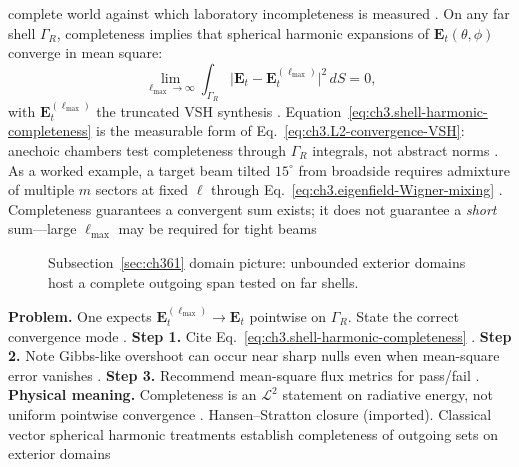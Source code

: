 complete world against which laboratory incompleteness is measured .
On any far shell \(\Gamma_R\), completeness implies that spherical harmonic expansions of
\(\mathbf{E}_{t}(\theta,\phi)\) converge in mean square:
\begin{equation}
\label{eq:ch3.shell-harmonic-completeness}
\lim_{\ell_{\max}\to\infty}
\int_{\Gamma_R}
\big|\mathbf{E}_{t}-\mathbf{E}_{t}^{(\ell_{\max})}\big|^{2}\,dS
=
0,
\end{equation}
with \(\mathbf{E}_{t}^{(\ell_{\max})}\) the truncated VSH synthesis .
Equation~\eqref{eq:ch3.shell-harmonic-completeness} is the measurable form of
Eq.~\eqref{eq:ch3.L2-convergence-VSH}: anechoic chambers test completeness through \(\Gamma_R\) integrals, not abstract
norms .
As a worked example, a target beam tilted \(15^{\circ}\) from broadside requires admixture of multiple \(m\) sectors at fixed \(\ell\)
through Eq.~\eqref{eq:ch3.eigenfield-Wigner-mixing} . Completeness guarantees a convergent
sum exists; it does not guarantee a \emph{short} sum---large \(\ell_{\max}\) may be required for tight beams
\begin{figure}[t]
\centering
{}
\caption{Subsection~\ref{sec:ch361} domain picture: unbounded exterior domains host a complete outgoing span tested on
far shells.}
\label{fig:ch3.361-domain-complete}
\end{figure}
\textbf{Problem.} One expects \(\mathbf{E}_{t}^{(\ell_{\max})}\to\mathbf{E}_{t}\) pointwise on \(\Gamma_R\). State the
correct convergence mode .
\textbf{Step 1.} Cite Eq.~\eqref{eq:ch3.shell-harmonic-completeness} .
\textbf{Step 2.} Note Gibbs-like overshoot can occur near sharp nulls even when mean-square error vanishes .
\textbf{Step 3.} Recommend mean-square flux metrics for pass/fail .
\textbf{Physical meaning.} Completeness is an \(\mathcal{L}^{2}\) statement on radiative energy, not uniform pointwise
convergence .
Hansen--Stratton closure (imported). Classical vector spherical harmonic treatments establish completeness of outgoing sets on exterior domains
